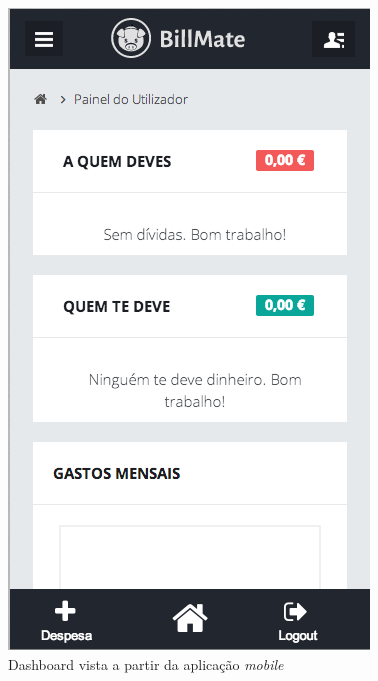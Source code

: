 \begin{figure}[ht]
\centering
\includegraphics[width=.9\textwidth]{images/protmobile}
\caption{Dashboard vista a partir da aplicação \emph{mobile}}
\label{fig:proto_mobile}
\end{figure}
